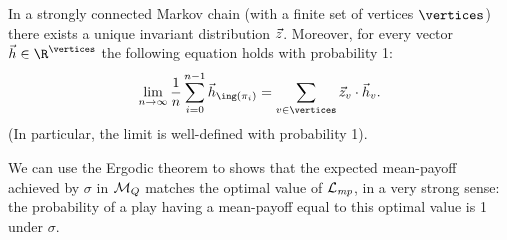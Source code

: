 \begin{theorem}
\label{5-thm:ergodic} In a strongly connected Markov chain (with a finite set of vertices $\vertices$) there exists a unique invariant distribution $\vec{z}$. Moreover, for every vector $\vec{h}\in \R^{\vertices}$ the following equation holds with probability 1:
\[
\lim_{n \rightarrow \infty} \frac{1}{n} \sum_{i=0}^{n-1}\vec{h}_{\ing(\pi_i)} = \sum_{v\in\vertices} \invdist_v\cdot \vec{h}_v.
\]
(In particular, the limit is well-defined with probability 1).
\end{theorem}


We can use the Ergodic theorem to shows that the expected mean-payoff achieved by $\sigma$ in $\mathcal{M}_{Q}$ matches the optimal value of $ \mathcal{L}_{\mathit{mp}} $, in a very strong sense: the probability of a play having a mean-payoff equal to this optimal value is 1 under $ \sigma $.

